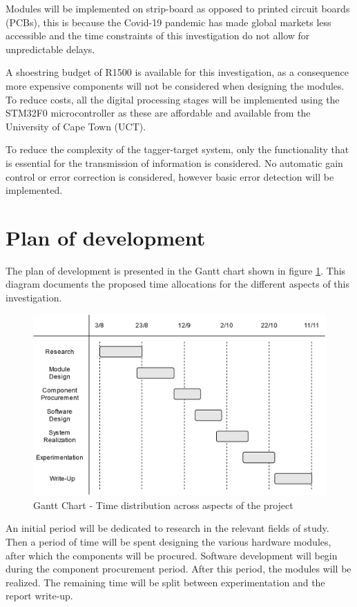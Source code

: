 Modules will be implemented on strip-board as opposed to printed circuit boards (PCBs), this is because the Covid-19 pandemic has made global markets less accessible and the time constraints of this investigation do not allow for unpredictable delays.

A shoestring budget of R1500 is available for this investigation, as a consequence more expensive components will not be considered when designing the modules. To reduce costs, all the digital processing stages will be implemented using the STM32F0 microcontroller as these are affordable and available from the University of Cape Town (UCT).

To reduce the complexity of the tagger-target system, only the functionality that is essential for the transmission of information is considered. No automatic gain control or error correction is considered, however basic error detection will be implemented.





\section{Plan of development}

The plan of development is presented in the Gantt chart shown in figure \ref{fig:gantt_chart}. This diagram documents the proposed time allocations for the different aspects of this investigation.

\begin{figure}[H]
	\centering
	\includegraphics[width=0.8\linewidth]{figures/introduction/gantt_chart.png}
	\caption{Gantt Chart - Time distribution across aspects of the project}
	\label{fig:gantt_chart}
\end{figure}

An initial period will be dedicated to research in the relevant fields of study. Then a period of time will be spent designing the various hardware modules, after which the components will be procured. Software development will begin during the component procurement period. After this period, the modules will be realized. The remaining time will be split between experimentation and the report write-up.